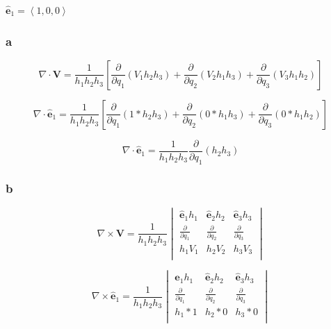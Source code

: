 \documentclass[12pt]{article}
\begin{document}
\(\hat{\mathbf{e}}_1 = \left\langle1, 0, 0\right\rangle \)

\subsubsection{a}

\[
    \nabla \cdot \textbf{V} = \frac{1}{h_1 h_2 h_3}
    \left[
        \frac{\partial}{\partial q_1}\left(V_1 h_2 h_3\right)
        + \frac{\partial}{\partial q_2}\left(V_2 h_1 h_3\right)
        + \frac{\partial}{\partial q_3}\left(V_3 h_1 h_2\right)
        \right]
\]

\[
    \nabla \cdot \hat{\mathbf{e}}_1 = \frac{1}{h_1 h_2 h_3}
    \left[
        \frac{\partial}{\partial q_1}\left(1 * h_2 h_3\right)
        + \frac{\partial}{\partial q_2}\left(0 * h_1 h_3\right)
        + \frac{\partial}{\partial q_3}\left(0 * h_1 h_2\right)
        \right]
\]

\[
    \nabla \cdot \hat{\mathbf{e}}_1 = \frac{1}{h_1 h_2 h_3} \frac{\partial}{\partial q_1}\left(h_2 h_3\right)
\]

\subsubsection{b}

\[
    \nabla \times \textbf{V} = \frac{1}{h_1 h_2 h_3}
    \begin{vmatrix}
        \hat{\mathbf{e}}_1 h_1        & \hat{\mathbf{e}}_2 h_2        & \hat{\mathbf{e}}_3 h_3        \\
        \frac{\partial}{\partial q_1} & \frac{\partial}{\partial q_2} & \frac{\partial}{\partial q_3} \\
        h_1 V_1                       & h_2 V_2                       & h_3 V_3                       \\
    \end{vmatrix}
\]

\[
    \nabla \times \hat{\mathbf{e}}_1 = \frac{1}{h_1 h_2 h_3}
    \begin{vmatrix}
        \hat{\mathbf{e}}_1 h_1        & \hat{\mathbf{e}}_2 h_2        & \hat{\mathbf{e}}_3 h_3        \\
        \frac{\partial}{\partial q_1} & \frac{\partial}{\partial q_2} & \frac{\partial}{\partial q_3} \\
        h_1*1                         & h_2*0                         & h_3*0                         \\
    \end{vmatrix}
\]
\end{document}
